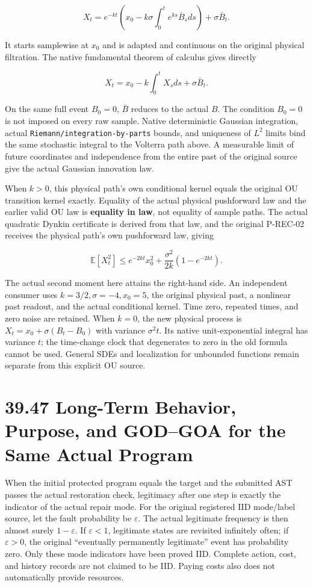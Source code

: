 \documentclass[
  english,
  11pt,
  oneside]{book}
\begin{document}
\[X_t=e^{-kt}\left(x_0-k\sigma\int_0^t e^{ks}\bar B_sds\right)
+\sigma\bar B_t.\]

It starts samplewise at \(x_0\) and is adapted and continuous on the original physical filtration. The native fundamental theorem of calculus gives directly

\[X_t=x_0-k\int_0^t X_sds+\sigma\bar B_t.\]

On the same full event \(B_0=0\), \(\bar B\) reduces to the actual \(B\). The condition \(B_0=0\) is not imposed on every raw sample. Native deterministic Gaussian integration, actual \nolinkurl{Riemann/integration-by-parts} bounds, and uniqueness of \(L^2\) limits bind the same stochastic integral to the Volterra path above. A measurable limit of future coordinates and independence from the entire past of the original source give the actual Gaussian innovation law.

When \(k>0\), this physical path's own conditional kernel equals the original OU transition kernel exactly. Equality of the actual physical pushforward law and the earlier valid OU law is \textbf{equality in law}, not equality of sample paths. The actual quadratic Dynkin certificate is derived from that law, and the original P-REC-02 receives the physical path's own pushforward law, giving

\[\mathbb E[X_t^2]\le e^{-2kt}x_0^2+
\frac{\sigma^2}{2k}(1-e^{-2kt}).\]

The actual second moment here attains the right-hand side. An independent consumer uses \(k=3/2,\sigma=-4,x_0=5\), the original physical past, a nonlinear past readout, and the actual conditional kernel. Time zero, repeated times, and zero noise are retained. When \(k=0\), the new physical process is \(X_t=x_0+\sigma(B_t-B_0)\) with variance \(\sigma^2t\). Its native unit-exponential integral has variance \(t\); the time-change clock that degenerates to zero in the old formula cannot be used. General SDEs and localization for unbounded functions remain separate from this explicit OU source.

\section{39.47 Long-Term Behavior, Purpose, and GOD--GOA for the Same Actual Program}\label{long-term-behavior-purpose-and-godgoa-for-the-same-actual-program}

When the initial protected program equals the target and the submitted AST passes the actual restoration check, legitimacy after one step is exactly the indicator of the actual repair mode. For the original registered IID mode/label source, let the fault probability be \(\varepsilon\). The actual legitimate frequency is then almost surely \(1-\varepsilon\). If \(\varepsilon<1\), legitimate states are revisited infinitely often; if \(\varepsilon>0\), the original ``eventually permanently legitimate'' event has probability zero. Only these mode indicators have been proved IID. Complete action, cost, and history records are not claimed to be IID. Paying costs also does not automatically provide resources.
\end{document}
